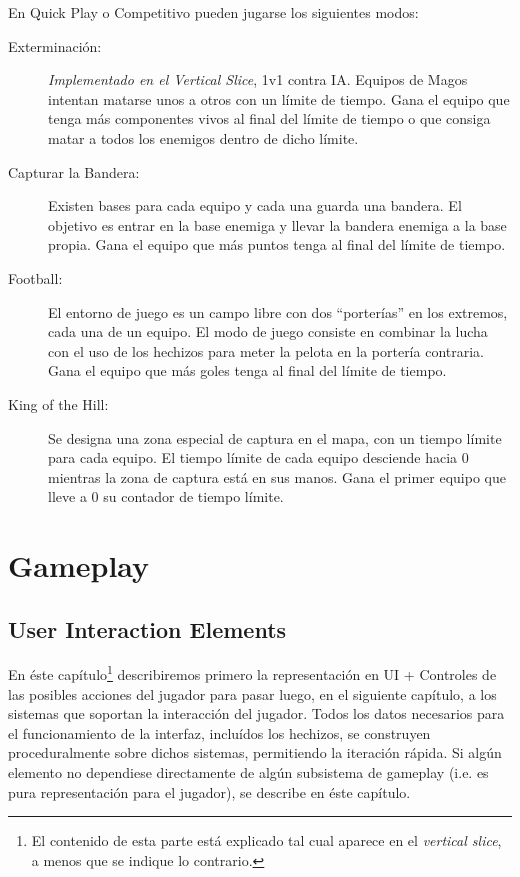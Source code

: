 \documentclass[12pt]{report}
\newcommand*\cleartoleftpage{%
  \clearpage
  \ifodd\value{page}\hbox{}\newpage\fi
}
\begin{document}
En Quick Play o Competitivo pueden jugarse los siguientes modos:

\begin{description}
\item[Exterminación:] \textit{Implementado en el Vertical Slice}, 1v1 contra IA. Equipos de Magos intentan matarse unos a otros con un límite de tiempo. Gana el equipo que tenga más componentes vivos al final del límite de tiempo o que consiga matar a todos los enemigos dentro de dicho límite.
\item[Capturar la Bandera:] Existen bases para cada equipo y cada una guarda una bandera. El objetivo es entrar en la base enemiga y llevar la bandera enemiga a la base propia. Gana el equipo que más puntos tenga al final del límite de tiempo.
\item[Football:] El entorno de juego es un campo libre con dos ``porterías'' en los extremos, cada una de un equipo. El modo de juego consiste en combinar la lucha con el uso de los hechizos para meter la pelota en la portería contraria. Gana el equipo que más goles tenga al final del límite de tiempo.
\item[King of the Hill:] Se designa una zona especial de captura en el mapa, con un tiempo límite para cada equipo. El tiempo límite de cada equipo desciende hacia 0 mientras la zona de captura está en sus manos. Gana el primer equipo que lleve a 0 su contador de tiempo límite.
\end{description}

\cleartoleftpage

\part{Gameplay}

\chapter{User Interaction Elements}

En éste capítulo\footnote{El contenido de esta parte está explicado tal cual aparece en el \textit{vertical slice}, a menos que se indique lo contrario.} describiremos primero la representación en UI + Controles de las posibles acciones del jugador para pasar luego, en el siguiente capítulo, a los sistemas que soportan la interacción del jugador. Todos los datos necesarios para el funcionamiento de la interfaz, incluídos los hechizos, se construyen proceduralmente sobre dichos sistemas, permitiendo la iteración rápida. Si algún elemento no dependiese directamente de algún subsistema de gameplay (i.e. es pura representación para el jugador), se describe en éste capítulo.
\end{document}
